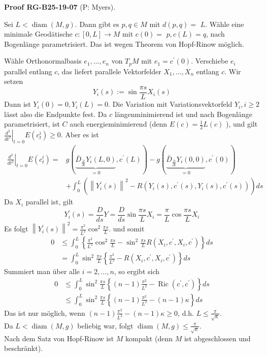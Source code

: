 \documentclass[10pt, letterpaper]{article}
\newcommand{\CustomHeading}[3]{%
  \par\medskip\noindent%
  \textbf{#1 #2} \textnormal{(#3)}.\enskip%
}
\newenvironment{PROOF}[2]{\begin{unitbox}\CustomHeading{Proof}{#1}{#2}}{\end{unitbox}}
\begin{document}
\begin{PROOF}{RG-B25-19-07}{P: Myers}
Sei $L<\operatorname{diam}(M, g)$. Dann gibt es $p, q \in M$ mit $d(p, q)=$ $L$. Wähle eine minimale Geodätische $c:[0, L] \rightarrow M$ mit $c(0)=$ $p, c(L)=q$, nach Bogenlänge parametrisiert. Das ist wegen Theorem von Hopf-Rinow möglich.

Wähle Orthonormalbasis $e_{1}, \ldots, e_{n}$ von $T_{p} M$ mit $e_{1}=c^{\prime}(0)$. Verschiebe $e_{i}$ parallel entlang $c$, das liefert parallele Vektorfelder $X_{1}, \ldots, X_{n}$ entlang $c$. Wir setzen
$$
Y_{i}(s):=\sin \frac{\pi s}{L} X_{i}(s)
$$
Dann ist $Y_{i}(0)=0, Y_{i}(L)=0$.
Die Variation mit Variationsvektorfeld $Y_{i}, i \geq 2$ lässt also die Endpunkte fest. Da $c$ längenminimierend ist und nach Bogenlänge parametrisiert, ist $C$ auch energieminimierend (denn $E(c)=\frac{1}{2} L(c)$ ), und gilt $\left.\frac{d^{2}}{d t^{2}}\right|_{t=0} E\left(c_{t}^{i}\right) \geq 0$. Aber es ist
$$
\begin{aligned}
\left.\frac{d^{2}}{d t^{2}}\right|_{t=0} E\left(c_{t}^{i}\right)= & g(\underbrace{\bar{D}_{\frac{\partial}{\partial t}} Y_{i}(L, 0)}_{=0}, c^{\prime}(L))-g(\underbrace{\bar{D}_{\frac{\partial}{\partial t}} Y_{i}(0,0)}_{=0}, c^{\prime}(0)) \\
& +\int_{0}^{L}\left(\left\|Y_{i}^{\prime}(s)\right\|^{2}-R\left(Y_{i}(s), c^{\prime}(s), Y_{i}(s), c^{\prime}(s)\right)\right) d s
\end{aligned}
$$
Da $X_{i}$ parallel ist, gilt
$$
Y_{i}^{\prime}(s)=\frac{D}{d s} Y=\frac{D}{d s} \sin \frac{\pi s}{L} X_{i}=\frac{\pi}{L} \cos \frac{\pi s}{L} X_{i}
$$
Es folgt $\left\|Y_{i}^{\prime}(s)\right\|^{2}=\frac{\pi^{2}}{L^{2}} \cos ^{2} \frac{\pi s}{L}$. und somit
$$
\begin{aligned}
0 & \leq \int_{0}^{L}\left\{\frac{\pi^{2}}{L^{2}} \cos ^{2} \frac{\pi s}{L}-\sin ^{2} \frac{\pi s}{L} R\left(X_{i}, c^{\prime}, X_{i}, c^{\prime}\right)\right\} d s \\
& =\int_{0}^{L} \sin ^{2} \frac{\pi s}{L}\left\{\frac{\pi^{2}}{L^{2}}-R\left(X_{i}, c^{\prime}, X_{i}, c^{\prime}\right)\right\} d s
\end{aligned}
$$
Summiert man über alle $i=2, \ldots, n$, so ergibt sich
$$
\begin{aligned}
0 & \leq \int_{0}^{L} \sin ^{2} \frac{\pi s}{L}\left\{(n-1) \frac{\pi^{2}}{L^{2}}-\operatorname{Ric}\left(c^{\prime}, c^{\prime}\right)\right\} d s \\
& \leq \int_{0}^{L} \sin ^{2} \frac{\pi s}{L}\left\{(n-1) \frac{\pi^{2}}{L^{2}}-(n-1) \kappa\right\} d s
\end{aligned}
$$
Das ist nur möglich, wenn $(n-1) \frac{\pi^{2}}{L^{2}}-(n-1) \kappa \geq 0$, d.h. $L \leq \frac{\pi}{\sqrt{\kappa}}$.\\
Da $L<\operatorname{diam}(M, g)$ beliebig war, folgt $\operatorname{diam}(M, g) \leq \frac{\pi}{\sqrt{\kappa}}$.\\
Nach dem Satz von Hopf-Rinow ist $M$ kompakt (denn $M$ ist abgeschlossen und beschränkt).


\end{PROOF}
\end{document}
